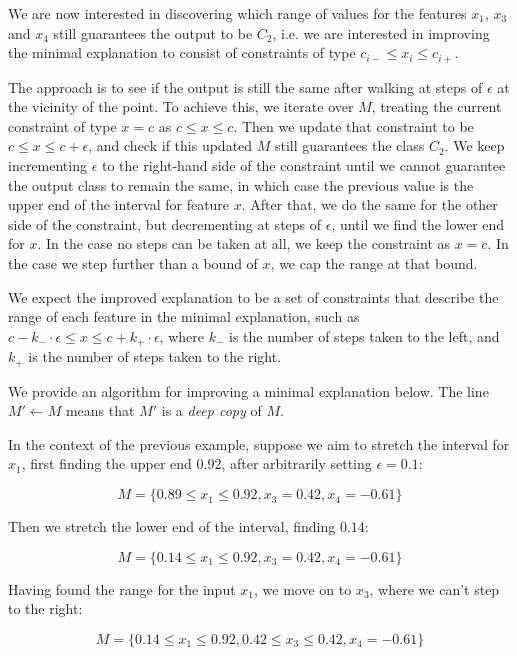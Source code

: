\documentclass[12pt]{article}
\begin{document}
We are now interested in discovering which range of values for the features $x_1$, $x_3$ and $x_4$ still guarantees the output to be $C_2$, i.e. we are interested in improving the minimal explanation to consist of constraints of type $c_{i-} \le x_i \le c_{i+}$.

The approach is to see if the output is still the same after walking at steps of $\epsilon$ at the vicinity of the point.
To achieve this, we iterate over $M$, treating the current constraint of type $x = c$ as $c \le x \le c$.
Then we update that constraint to be $c \le x \le c + \epsilon$, and check if this updated $M$ still guarantees the class $C_2$.
We keep incrementing $\epsilon$ to the right-hand side of the constraint until we cannot guarantee the output class to remain the same, in which case the previous value is the upper end of the interval for feature $x$.
After that, we do the same for the other side of the constraint, but decrementing at steps of $\epsilon$, until we find the lower end for $x$.
In the case no steps can be taken at all, we keep the constraint as $x = c$.
In the case we step further than a bound of $x$, we cap the range at that bound.

We expect the improved explanation to be a set of constraints that describe the range of each feature in the minimal explanation, such as $c - k_{-} \cdot \epsilon \le x \le c + k_{+} \cdot \epsilon$, where $k_{-}$ is the number of steps taken to the left, and $k_{+}$ is the number of steps taken to the right.

We provide an algorithm for improving a minimal explanation below. The line $M' \gets M$ means that $M'$ is a \emph{deep copy} of $M$.

In the context of the previous example, suppose we aim to stretch the interval for $x_1$, first finding the upper end $0.92$, after arbitrarily setting $\epsilon = 0.1$:

\[
M = \{0.89 \le x_1 \le 0.92,
      x_3 = 0.42,
      x_4 = -0.61\}
\]

Then we stretch the lower end of the interval, finding $0.14$:

\[
M = \{0.14 \le x_1 \le 0.92,
      x_3 = 0.42,
      x_4 = -0.61\}
\]

Having found the range for the input $x_1$, we move on to $x_3$, where we can't step to the right:

\[
M = \{0.14 \le x_1 \le 0.92,
      0.42 \le x_3 \le 0.42,
      x_4 = -0.61\}
\]
\end{document}
